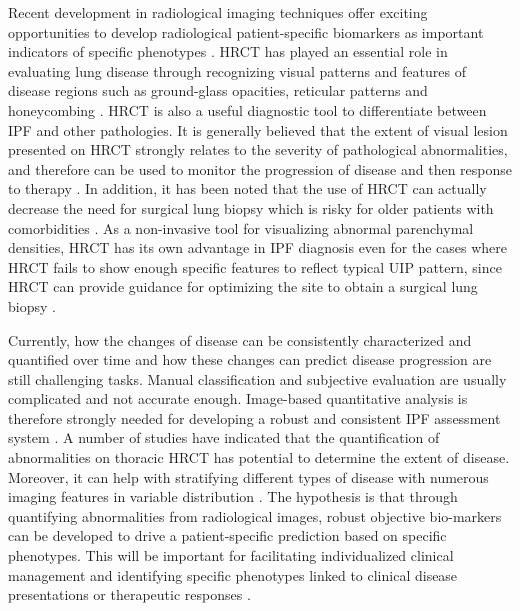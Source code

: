 Recent development in radiological imaging techniques offer exciting opportunities to develop radiological patient-specific biomarkers as important indicators of specific phenotypes \citep{devaraj2014imaging,gotway2007challenges}. HRCT has played an essential role in evaluating lung disease through recognizing visual patterns and features of disease regions such as ground-glass opacities, reticular patterns and honeycombing \citep{mueller2007every}. HRCT is also a useful diagnostic tool to differentiate between IPF and other pathologies. It is generally believed that the extent of visual lesion presented on HRCT strongly relates to the severity of pathological abnormalities, and therefore can be used to monitor the progression of disease and then response to therapy \citep{kazerooni1997thin,kim1999nonspecific,wells2003idiopathic,saketkoo2011developing}. In addition, it has been noted that the use of HRCT can actually decrease the need for surgical lung biopsy which is risky for older patients with comorbidities \citep{bartholmai2013quantitative}. As a non-invasive tool for visualizing abnormal parenchymal densities, HRCT has its own advantage in IPF diagnosis even for the cases where HRCT fails to show enough specific features to reflect typical UIP pattern, since HRCT can provide guidance for optimizing the site to obtain a surgical lung biopsy \citep{kazerooni2001high, diette2005high, misumi2006idiopathic, costabel2007diffuse}. 

Currently, how the changes of disease can be consistently characterized and quantified over time and how these changes can predict disease progression are still challenging tasks. Manual classification and subjective evaluation are usually complicated and not accurate enough. Image-based quantitative analysis is therefore strongly needed for developing a robust and consistent IPF assessment system \citep{gotway2007challenges,lynch2005high}. A number of studies have indicated that the quantification of abnormalities on thoracic HRCT has potential to determine the extent of disease. Moreover, it can help with stratifying different types of disease with numerous imaging features in variable distribution \citep{best2008idiopathic,wells2003idiopathic, sumikawa2008computed, bartholmai2013quantitative}. The hypothesis is that through quantifying abnormalities from radiological images, robust objective bio-markers can be developed to drive a patient-specific prediction based on specific phenotypes. This will be important for facilitating individualized clinical management and identifying specific phenotypes linked to clinical disease presentations or therapeutic responses \citep{raghunath2014quantitative}.
\newpage

